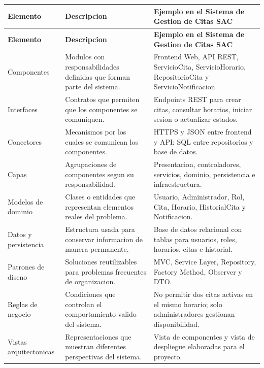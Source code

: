 \documentclass[12pt,letterpaper]{article}
\begin{document}
\begin{longtable}{|p{3.8cm}|p{4.8cm}|p{5.9cm}|}
\hline
\textbf{Elemento} & \textbf{Descripcion} & \textbf{Ejemplo en el Sistema de Gestion de Citas SAC} \\
\hline
\endfirsthead
\hline
\textbf{Elemento} & \textbf{Descripcion} & \textbf{Ejemplo en el Sistema de Gestion de Citas SAC} \\
\hline
\endhead
\hline
\endfoot
\hline
\endlastfoot

Componentes & Modulos con responsabilidades definidas que forman parte del sistema. & Frontend Web, API REST, ServicioCita, ServicioHorario, RepositorioCita y ServicioNotificacion. \\
\hline

Interfaces & Contratos que permiten que los componentes se comuniquen. & Endpoints REST para crear citas, consultar horarios, iniciar sesion o actualizar estados. \\
\hline

Conectores & Mecanismos por los cuales se comunican los componentes. & HTTPS y JSON entre frontend y API; SQL entre repositorios y base de datos. \\
\hline

Capas & Agrupaciones de componentes segun su responsabilidad. & Presentacion, controladores, servicios, dominio, persistencia e infraestructura. \\
\hline

Modelos de dominio & Clases o entidades que representan elementos reales del problema. & Usuario, Administrador, Rol, Cita, Horario, HistorialCita y Notificacion. \\
\hline

Datos y persistencia & Estructura usada para conservar informacion de manera permanente. & Base de datos relacional con tablas para usuarios, roles, horarios, citas e historial. \\
\hline

Patrones de diseno & Soluciones reutilizables para problemas frecuentes de organizacion. & MVC, Service Layer, Repository, Factory Method, Observer y DTO. \\
\hline

Reglas de negocio & Condiciones que controlan el comportamiento valido del sistema. & No permitir dos citas activas en el mismo horario; solo administradores gestionan disponibilidad. \\
\hline

Vistas arquitectonicas & Representaciones que muestran diferentes perspectivas del sistema. & Vista de componentes y vista de despliegue elaboradas para el proyecto. \\
\hline


\end{longtable}
\end{document}
